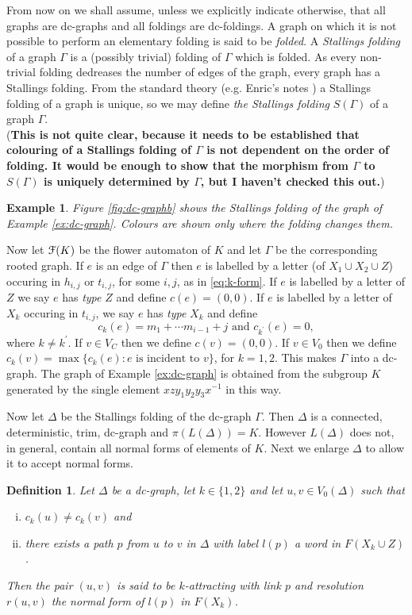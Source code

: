\documentclass[a4paper,12pt]{article}
\newcommand{\G}{\Gamma }
\newcommand{\D}{\Delta }
\newcommand{\cF}{{\cal{F}}}
\newtheorem{definition}[theorem]{Definition}
\newtheorem{exam}[theorem]{Example}
\newenvironment{example}{\begin{exam} \rm}{\end{exam}}
\numberwithin{equation}{section}
\numberwithin{figure}{section}
\newcommand{\be}{\begin{enumerate}}
\newcommand{\ee}{\end{enumerate}}
\begin{document}
From now on we shall assume, unless we explicitly indicate otherwise,
 that all graphs are dc-graphs and  all foldings are dc-foldings. 
A graph on which  it is not possible to perform an elementary
folding is 
said to be {\em folded}. A {\em Stallings folding} of a graph $\G$ is
 a (possibly trivial) folding of $\G$ which is folded. As every non-trivial 
folding dedreases
 the number of edges of the graph, every graph has a Stallings folding. From the
standard theory (e.g. Enric's notes \cite{ventura11}) a Stallings folding of a graph is unique,
so we may define {\em the Stallings folding} $S(\G)$ of a graph $\G$.\\
({\bf This is not quite clear, because it needs to be established that colouring
of a Stallings folding of $\G$ is not dependent on  the order of folding. It 
would be enough to show that the morphism from $\G$ to $S(\G)$ is uniquely 
determined by $\G$, but I haven't checked this out.})
\begin{example}
Figure \ref{fig:dc-graphb} shows the Stallings folding of the graph of 
Example \ref{ex:dc-graph}. Colours are shown only where the folding changes them.
\end{example}
%
%
Now let $\cF(K)$ be the flower automaton of $K$ and let 
$\G$ be the corresponding rooted graph. If $e$ is an edge of $\G$ then
$e$ is labelled by a letter (of $X_1\cup X_2 \cup Z$) 
occuring in $h_{i,j}$ or $t_{i,j}$, for some $i,j$, as in 
\eqref{eq:k-form}. If $e$ is labelled by a letter of $Z$ we say $e$ has {\em type} $Z$
and define $c(e)=(0,0)$. If $e$ is labelled by a letter of $X_k$ occuring in 
$t_{i,j}$, we say $e$ has {\em type} $X_k$ and define 
\[c_k(e)=m_1+\cdots m_{i-1} +j\textrm{ and } c_{k^\prime}(e)=0,\]
where $k\neq k^\prime$. If $v\in V_C$ then we define $c(v)=(0,0)$. If $v\in V_0$ then
 we define $c_k(v)=\max\{c_k(e): e \textrm{ is incident to } v\}$, for $k=1,2$.  
This makes $\G$ into a dc-graph. The graph of Example \ref{ex:dc-graph} is obtained 
from the subgroup $K$ generated by the single element $xzy_1y_2y_3x^{-1}$ in this way.

Now let $\D$ be the Stallings folding of the dc-graph $\G$.  Then
 $\D$ is a connected, deterministic, trim, dc-graph and $\pi(L(\D))=K$. However
$L(\D)$ does not, in general, contain all normal forms of elements of $K$. 
Next we enlarge $\D$ to allow it to accept normal forms. 
\begin{definition}\label{def:attractive}
Let $\D$ be a  dc-graph, let $k\in \{1,2\}$ and let 
$u,v\in V_0(\D)$ such that 
\be[(i)]
\item $c_k(u)\neq c_k(v)$ and 
\item there exists a path $p$ from $u$ to $v$ in $\D$ with label $l(p)$ 
a word in $F(X_k\cup Z)$. 
\ee
Then the pair $(u,v)$ is said to be 
$k${\em -attracting} with {\em link} $p$ and {\em resolution} 
$r(u,v)$ the normal
form of $l(p)$ in $F(X_k)$. 
\end{definition}
\end{document}
